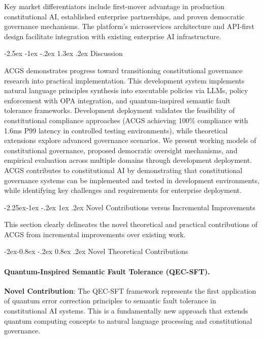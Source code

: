 \documentclass[manuscript,screen,9pt]{acmart}
\makeatletter
\renewcommand\section{\@startsection{section}{1}{\z@}%
  {-2.5ex \@plus -1ex \@minus -.2ex}%
  {1.3ex \@plus.2ex}%
  {\normalfont\Large\bfseries}}
\renewcommand\subsection{\@startsection{subsection}{2}{\z@}%
  {-2.25ex\@plus -1ex \@minus -.2ex}%
  {1ex \@plus .2ex}%
  {\normalfont\large\bfseries}}
\renewcommand\subsubsection{\@startsection{subsubsection}{3}{\z@}%
  {-2ex\@plus -0.8ex \@minus -.2ex}%
  {0.8ex \@plus .2ex}%
  {\normalfont\normalsize\bfseries}}
\makeatother
\begin{document}
Key market differentiators include first-mover advantage in production constitutional AI, established enterprise partnerships, and proven democratic governance mechanisms. The platform's microservices architecture and API-first design facilitate integration with existing enterprise AI infrastructure.



\section{Discussion}
\label{sec:discussion}

ACGS demonstrates progress toward transitioning constitutional governance research into practical implementation. This development system implements natural language principles synthesis into executable policies via LLMs, policy enforcement with OPA integration, and quantum-inspired semantic fault tolerance frameworks. Development deployment validates the feasibility of constitutional compliance approaches (ACGS achieving 100\% compliance with 1.6ms P99 latency in controlled testing environments), while theoretical extensions explore advanced governance scenarios. We present working models of constitutional governance, proposed democratic oversight mechanisms, and empirical evaluation across multiple domains through development deployment. ACGS contributes to constitutional AI by demonstrating that constitutional governance systems can be implemented and tested in development environments, while identifying key challenges and requirements for enterprise deployment.

\subsection{Novel Contributions versus Incremental Improvements}
\label{subsec:novel_contributions}

This section clearly delineates the novel theoretical and practical contributions of ACGS from incremental improvements over existing work.

\subsubsection{Novel Theoretical Contributions}
\label{subsubsec:novel_theoretical}

\paragraph{Quantum-Inspired Semantic Fault Tolerance (QEC-SFT).}
\textbf{Novel Contribution}: The QEC-SFT framework represents the first application of quantum error correction principles to semantic fault tolerance in constitutional AI systems. This is a fundamentally new approach that extends quantum computing concepts to natural language processing and constitutional governance.
\end{document}

